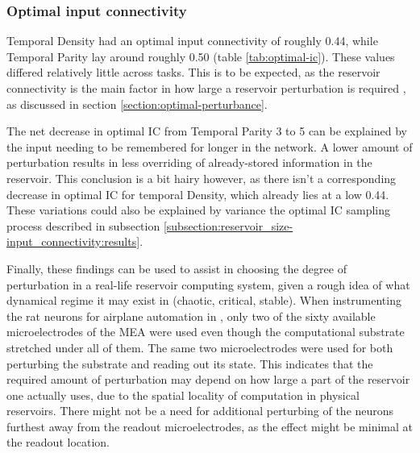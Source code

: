 \subsubsection{Optimal input connectivity}

Temporal Density had an optimal input connectivity of roughly 0.44, while Temporal Parity lay around roughly 0.50 (table \ref{tab:optimal-ic}).
These values differed relatively little across tasks.
This is to be expected, as the reservoir connectivity is the main factor in how large a reservoir perturbation is required \cite{rbn-reservoir},
as discussed in section \ref{section:optimal-perturbance}.

The net decrease in optimal IC from Temporal Parity 3 to 5 can be explained by the input needing to be remembered for longer in the network.
A lower amount of perturbation results in less overriding of already-stored information in the reservoir.
This conclusion is a bit hairy however,
as there isn't a corresponding decrease in optimal IC for temporal Density, which already lies at a low 0.44.
These variations could also be explained by variance the optimal IC sampling process described in subsection \ref{subsection:reservoir_size-input_connectivity:results}.

Finally, these findings can be used to assist in choosing the degree of perturbation in a real-life reservoir computing system,
given a rough idea of what dynamical regime it may exist in (chaotic, critical, stable).
When instrumenting the rat neurons for airplane automation in \cite{demarse2005adaptive},
only two of the sixty available microelectrodes of the MEA were used even though the computational substrate stretched under all of them.
The same two microelectrodes were used for both perturbing the substrate and reading out its state.
This indicates that the required amount of perturbation may depend on how large a part of the reservoir one actually uses,
due to the spatial locality of computation in physical reservoirs.
There might not be a need for additional perturbing of the neurons furthest away from the readout microelectrodes,
as the effect might be minimal at the readout location.
